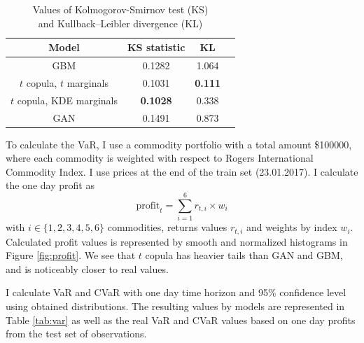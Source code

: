 \documentclass{article}
\begin{document}
\begin{table}[h]
    \begin{center}
    \begin{tabular}{ |c|c|c|c| } 
    \hline
    Model & KS statistic & KL \\ 
    \hline
    GBM & 0.1282 & 1.064 \\ 
    $t$ copula, $t$ marginals & 0.1031 & \textbf{0.111} \\ 
    $t$ copula, KDE marginals & \textbf{0.1028} & 0.338 \\ 
    GAN & 0.1491 & 0.873 \\ 
    \hline
    \end{tabular}
    \end{center}
    \caption{Values of Kolmogorov-Smirnov test (KS) \\and Kullback–Leibler divergence (KL)}
    \label{tab:quality}
\end{table}

To calculate the VaR, I use a commodity portfolio with a total amount \$100000, where each commodity is weighted with respect to Rogers International Commodity Index. I use prices at the end of the train set (23.01.2017). I calculate the one day profit as
$$\text{profit}_t = \sum_{i=1}^6 r_{t,i} \times w_i$$
with $i \in \{1, 2, 3, 4, 5 , 6\}$ commodities, returns values $r_{t, i}$ and weights by index $w_i$. Calculated profit values is represented by smooth and normalized histograms in Figure \ref{fig:profit}. We see that $t$ copula has heavier tails than GAN and GBM, and is noticeably closer to real values.

I calculate VaR and CVaR with one day time horizon and 95\% confidence level using obtained distributions. The resulting values by models are represented in Table \ref{tab:var} as well as the real VaR and CVaR values based on one day profits from the test set of observations.
\end{document}
